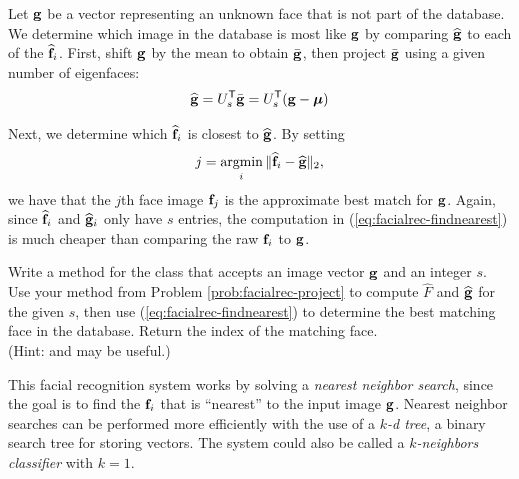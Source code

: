Let $\mathbf{g}$ be a vector representing an unknown face that is not part of the database.
We determine which image in the database is most like $\mathbf{g}$ by comparing $\widehat{\mathbf{g}}$ to each of the $\widehat{\mathbf{f}}_i$.
First, shift $\mathbf{g}$ by the mean to obtain $\bar{\mathbf{g}}$, then project $\bar{\mathbf{g}}$ using a given number of eigenfaces:
\begin{equation}
    \widehat{\mathbf{g}} = U_s^{\mathsf T}\bar{\mathbf{g}} = U_s^{\mathsf T}(\mathbf{g} - \boldsymbol{\mu})
    \label{eq:facialrec-unknownface}
\end{equation}

Next, we determine which $\widehat{\mathbf{f}}_i$ is closest to $\widehat{\mathbf{g}}$.
By setting
\begin{equation}
j = \mathop{{\text{argmin}}\vphantom{\sim}}\limits_{\displaystyle _{i}} \|\widehat{\f}_i - \widehat{\g}\|_2, %
\label{eq:facialrec-findnearest}
\end{equation}
we have that the $j$th face image $\mathbf{f}_j$ is the approximate best match for $\mathbf{g}$.
Again, since $\widehat{\mathbf{f}}_i$ and $\widehat{\mathbf{g}}_i$ only have $s$ entries, the computation in (\ref{eq:facialrec-findnearest}) is much cheaper than comparing the raw $\mathbf{f}_i$ to $\mathbf{g}$.

\begin{problem} %
Write a method for the  class that accepts an image vector $\mathbf{g}$ and an integer $s$.
Use your method from Problem \ref{prob:facialrec-project} to compute $\widehat{F}$ and $\widehat{\mathbf{g}}$ for the given $s$, then use (\ref{eq:facialrec-findnearest}) to determine the best matching face in the database.
Return the index of the matching face.
\\(Hint:  and  may be useful.)
\label{prob:facialrec-nearest}
\end{problem}

\begin{info}
This facial recognition system works by solving a \emph{nearest neighbor search}, since the goal is to find the $\mathbf{f}_i$ that is ``nearest'' to the input image $\mathbf{g}$.
Nearest neighbor searches can be performed more efficiently with the use of a \emph{$k$-d tree}, a binary search tree for storing vectors.
The system could also be called a \emph{$k$-neighbors classifier} with $k=1$.
\end{info}

